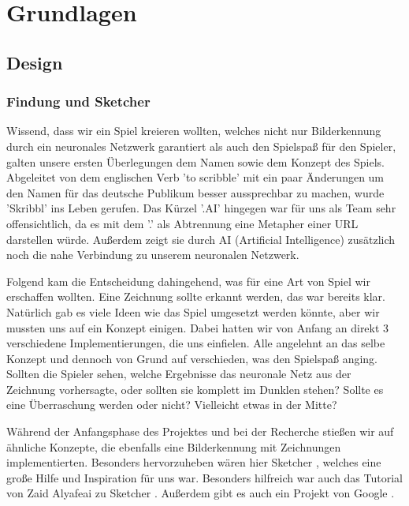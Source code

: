 \documentclass[11pt]{article}
\begin{document}
\pagebreak

\section{Grundlagen}
\label{chap: Grundlagen}
\subsection{Design}
\subsubsection{Findung und Sketcher}

Wissend, dass wir ein Spiel kreieren wollten, welches nicht nur Bilderkennung durch ein neuronales Netzwerk garantiert als auch den Spielspaß für den Spieler, galten unsere ersten Überlegungen dem Namen sowie dem Konzept des Spiels.
Abgeleitet von dem englischen Verb 'to scribble' mit ein paar Änderungen um den Namen für das deutsche Publikum besser aussprechbar zu machen, wurde 'Skribbl' ins Leben gerufen. Das Kürzel '.AI' hingegen war für uns als Team sehr offensichtlich, da es mit dem '.' als Abtrennung eine Metapher einer URL darstellen würde. Außerdem zeigt sie durch AI (Artificial Intelligence) zusätzlich noch die nahe Verbindung zu unserem neuronalen Netzwerk.

Folgend kam die Entscheidung dahingehend, was für eine Art von Spiel wir erschaffen wollten. Eine Zeichnung sollte erkannt werden, das war bereits klar. Natürlich gab es viele Ideen wie das Spiel umgesetzt werden könnte, aber wir mussten uns auf ein Konzept einigen. Dabei hatten wir von Anfang an direkt 3 verschiedene Implementierungen, die uns einfielen. Alle angelehnt an das selbe Konzept und dennoch von Grund auf verschieden, was den Spielspaß anging. Sollten die Spieler sehen, welche Ergebnisse das neuronale Netz aus der Zeichnung vorhersagte, oder sollten sie komplett im Dunklen stehen? Sollte es eine Überraschung werden oder nicht? Vielleicht etwas in der Mitte?

Während der Anfangsphase des Projektes und bei der Recherche stießen wir auf ähnliche Konzepte, die ebenfalls eine Bilderkennung mit Zeichnungen implementierten. Besonders hervorzuheben wären hier Sketcher \parencite{sketcher}, welches eine große Hilfe und Inspiration für uns war. Besonders hilfreich war auch das Tutorial von Zaid Alyafeai zu Sketcher \parencite{sketcherTutorial}. Außerdem gibt es auch ein Projekt von Google \parencite{quickDraw}.
\end{document}
